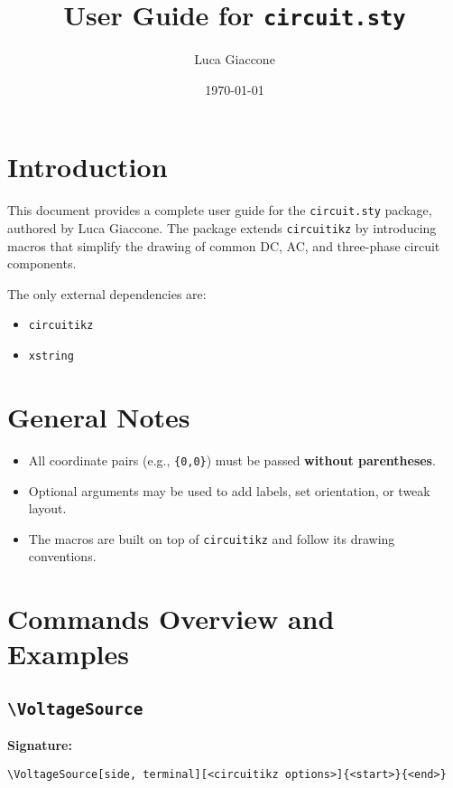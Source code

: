\documentclass[a4paper,12pt]{article}
\title{User Guide for \texttt{circuit.sty}}
\author{Luca Giaccone}
\date{\today}
\begin{document}
\maketitle

\tableofcontents
\newpage

\section{Introduction}

This document provides a complete user guide for the \texttt{circuit.sty} package, authored by Luca Giaccone. The package extends \texttt{circuitikz} by introducing macros that simplify the drawing of common DC, AC, and three-phase circuit components.

The only external dependencies are:
\begin{itemize}
    \item \texttt{circuitikz}
    \item \texttt{xstring}
\end{itemize}

\section{General Notes}

\begin{itemize}
    \item All coordinate pairs (e.g., \texttt{\{0,0\}}) must be passed \textbf{without parentheses}.
    \item Optional arguments may be used to add labels, set orientation, or tweak layout.
    \item The macros are built on top of \texttt{circuitikz} and follow its drawing conventions.
\end{itemize}

\section{Commands Overview and Examples}
\subsection{\texttt{\textbackslash VoltageSource}}

\textbf{Signature:}
\begin{verbatim}
\VoltageSource[side, terminal][<circuitikz options>]{<start>}{<end>}
\end{verbatim}
\end{document}
